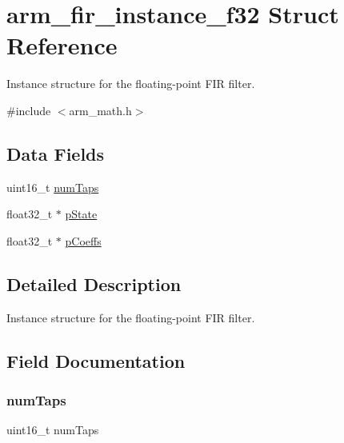 \hypertarget{structarm__fir__instance__f32}{}\section{arm\+\_\+fir\+\_\+instance\+\_\+f32 Struct Reference}
\label{structarm__fir__instance__f32}


Instance structure for the floating-\/point F\+IR filter.  




{\ttfamily \#include $<$arm\+\_\+math.\+h$>$}

\subsection*{Data Fields}
\begin{DoxyCompactItemize}
\item 
uint16\+\_\+t \mbox{\hyperlink{structarm__fir__instance__f32_a751941891e47f522a7f5375fe8990aac}{num\+Taps}}
\item 
float32\+\_\+t $\ast$ \mbox{\hyperlink{structarm__fir__instance__f32_a335c87e6fdc4b96601d95a5de8b9c463}{p\+State}}
\item 
float32\+\_\+t $\ast$ \mbox{\hyperlink{structarm__fir__instance__f32_aacbb8dd8eeba4b21fc2bb40076405ee3}{p\+Coeffs}}
\end{DoxyCompactItemize}


\subsection{Detailed Description}
Instance structure for the floating-\/point F\+IR filter. 

\subsection{Field Documentation}
\mbox{\label{structarm__fir__instance__f32_a751941891e47f522a7f5375fe8990aac}} 
\subsubsection{\texorpdfstring{num\+Taps}{numTaps}}
{\footnotesize\ttfamily uint16\+\_\+t num\+Taps}

